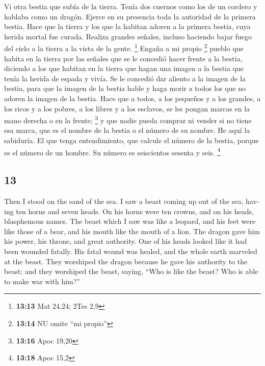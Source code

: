 \begin{paracol}{2}
 Vi otra bestia que subía de la tierra. Tenía dos cuernos
como los de un cordero y hablaba como un dragón.  Ejerce
en su presencia toda la autoridad de la primera bestia. Hace que la
tierra y los que la habitan adoren a la primera bestia, cuya herida
mortal fue curada.  Realiza grandes señales, incluso
haciendo bajar fuego del cielo a la tierra a la vista de la gente.
\footnote{\textbf{13:13} Mat 24,24; 2Tes 2,9}  Engaña a
mi propio \footnote{\textbf{13:14} NU omite ``mi propio''} pueblo que
habita en la tierra por las señales que se le concedió hacer frente a la
bestia, diciendo a los que habitan en la tierra que hagan una imagen a
la bestia que tenía la herida de espada y vivía.  Se le
concedió dar aliento a la imagen de la bestia, para que la imagen de la
bestia hable y haga morir a todos los que no adoren la imagen de la
bestia.  Hace que a todos, a los pequeños y a los
grandes, a los ricos y a los pobres, a los libres y a los esclavos, se
les pongan marcas en la mano derecha o en la frente; \footnote{\textbf{13:16}
  Apoc 19,20}  y que nadie pueda comprar ni vender si no
tiene esa marca, que es el nombre de la bestia o el número de su nombre.
 He aquí la sabiduría. El que tenga entendimiento, que
calcule el número de la bestia, porque es el número de un hombre. Su
número es seiscientos sesenta y seis. \footnote{\textbf{13:18} Apoc 15,2}

\switchcolumn
\begin{otherlanguage}{english}

\hypertarget{section-25}{%
\section{13}\label{section-25}}

 Then I stood on the sand of the sea. I saw a beast coming
up out of the sea, having ten horns and seven heads. On his horns were
ten crowns, and on his heads, blasphemous names.  The
beast which I saw was like a leopard, and his feet were like those of a
bear, and his mouth like the mouth of a lion. The dragon gave him his
power, his throne, and great authority.  One of his heads
looked like it had been wounded fatally. His fatal wound was healed, and
the whole earth marveled at the beast.  They worshiped the
dragon because he gave his authority to the beast; and they worshiped
the beast, saying, ``Who is like the beast? Who is able to make war with
him?''


\end{otherlanguage}
\end{paracol}

